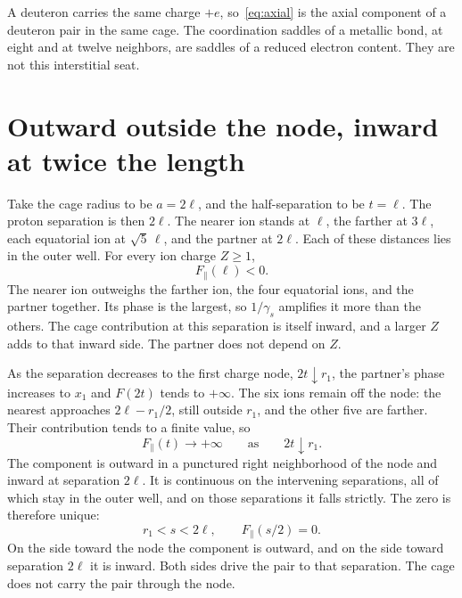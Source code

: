 \documentclass[a4paper]{article}
\begin{document}
A deuteron carries the same charge \(+e\), so~\eqref{eq:axial} is the axial component of a deuteron pair in the same cage. The coordination saddles of a metallic bond, at eight and at twelve neighbors, are saddles of a reduced electron content. They are not this interstitial seat.

\section{Outward outside the node, inward at twice the length}
\label{sec:seat}

Take the cage radius to be \(a=2\ell\), and the half-separation to be \(t=\ell\). The proton separation is then \(2\ell\). The nearer ion stands at \(\ell\), the farther at \(3\ell\), each equatorial ion at \(\sqrt{5}\,\ell\), and the partner at \(2\ell\). Each of these distances lies in the outer well. For every ion charge \(Z\ge 1\),
\begin{equation}
\label{eq:inward}
F_{\parallel}(\ell)<0.
\end{equation}
The nearer ion outweighs the farther ion, the four equatorial ions, and the partner together. Its phase is the largest, so \(1/\gamma_s\) amplifies it more than the others. The cage contribution at this separation is itself inward, and a larger \(Z\) adds to that inward side. The partner does not depend on \(Z\).

As the separation decreases to the first charge node, \(2t\downarrow r_1\), the partner's phase increases to \(x_1\) and \(F(2t)\) tends to \(+\infty\). The six ions remain off the node: the nearest approaches \(2\ell-r_1/2\), still outside \(r_1\), and the other five are farther. Their contribution tends to a finite value, so
\begin{equation}
\label{eq:diverge}
F_{\parallel}(t)\to +\infty
\qquad\text{as}\qquad
2t\downarrow r_1.
\end{equation}
The component is outward in a punctured right neighborhood of the node and inward at separation \(2\ell\). It is continuous on the intervening separations, all of which stay in the outer well, and on those separations it falls strictly. The zero is therefore unique:
\begin{equation}
\label{eq:balance}
r_1<s<2\ell,
\qquad
F_{\parallel}(s/2)=0.
\end{equation}
On the side toward the node the component is outward, and on the side toward separation \(2\ell\) it is inward. Both sides drive the pair to that separation. The cage does not carry the pair through the node.
\end{document}
